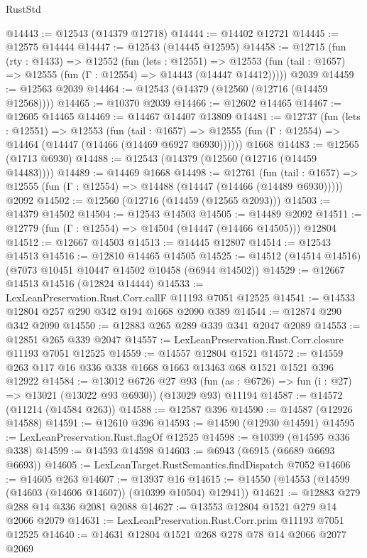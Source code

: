 \begin{lexlean}{RustStd}
\begin{coremodule}
@14443 := @12543 (@14379 @12718)
@14444 := @14402 @12721
@14445 := @12575 @14444
@14447 := @12543 (@14445 @12595)
@14458 := @12715
    (fun (rty : @1433) =>
    @12552
      (fun (lets : @12551) =>
      @12553 (fun (tail : @1657) => @12555 (fun (Γ : @12554) => @14443 (@14447 @14412)))))
    @2039
@14459 := @12563 @2039
@14464 := @12543 (@14379 (@12560 (@12716 (@14459 @12568))))
@14465 := @10370 @2039
@14466 := @12602 @14465
@14467 := @12605 @14465
@14469 := @14467 @14407 @13809
@14481 := @12737
    (fun (lets : @12551) =>
    @12553
      (fun (tail : @1657) =>
      @12555 (fun (Γ : @12554) => @14464 (@14447 (@14466 (@14469 @6927 @6930))))))
    @1668
@14483 := @12565 (@1713 @6930)
@14488 := @12543 (@14379 (@12560 (@12716 (@14459 @14483))))
@14489 := @14469 @1668
@14498 := @12761
    (fun (tail : @1657) => @12555 (fun (Γ : @12554) => @14488 (@14447 (@14466 (@14489 @6930)))))
    @2092
@14502 := @12560 (@12716 (@14459 (@12565 @2093)))
@14503 := @14379 @14502
@14504 := @12543 @14503
@14505 := @14489 @2092
@14511 := @12779 (fun (Γ : @12554) => @14504 (@14447 (@14466 @14505))) @12804
@14512 := @12667 @14503
@14513 := @14445 @12807
@14514 := @12543 @14513
@14516 := @12810 @14465 @14505
@14525 := @14512 (@14514 @14516) (@7073 @10451 @10447 @14502 @10458 (@6944 @14502))
@14529 := @12667 @14513 @14516 (@12824 @14444)
@14533 := LexLeanPreservation.Rust.Corr.callF @11193 @7051 @12525
@14541 := @14533 @12804 @257 @290 @342 @194 @1668 @2090 @389
@14544 := @12874 @290 @342 @2090
@14550 := @12883 @265 @289 @339 @341 @2047 @2089
@14553 := @12851 @265 @339 @2047
@14557 := LexLeanPreservation.Rust.Corr.closure @11193 @7051 @12525
@14559 := @14557 @12804 @1521
@14572 := @14559 @263 @117 @16 @336 @338 @1668 @1663 @13463 @68 @1521 @1521 @396 @12922
@14584 := @13012
    @6726
    @27
    @93
    (fun (as : @6726) => fun (i : @27) => @13021 (@13022 @93 @6930))
    (@13029 @93)
    @11194
@14587 := @14572 (@11214 (@14584 @263))
@14588 := @12587 @396
@14590 := @14587 (@12926 @14588)
@14591 := @12610 @396
@14593 := @14590 (@12930 @14591)
@14595 := LexLeanPreservation.Rust.flagOf @12525
@14598 := @10399 (@14595 @336 @338)
@14599 := @14593 @14598
@14603 := @6943 (@6915 (@6689 @6693 @6693))
@14605 := LexLeanTarget.RustSemantics.findDispatch @7052
@14606 := @14605 @263
@14607 := @13937 @16
@14615 := @14550 (@14553 (@14599 (@14603 (@14606 @14607)) (@10399 @10504) @12941))
@14621 := @12883 @279 @288 @14 @336 @2081 @2088
@14627 := @13553 @12804 @1521 @279 @14 @2066 @2079
@14631 := LexLeanPreservation.Rust.Corr.prim @11193 @7051 @12525
@14640 := @14631 @12804 @1521 @268 @278 @78 @14 @2066 @2077 @2069

\end{coremodule}
\end{lexlean}

